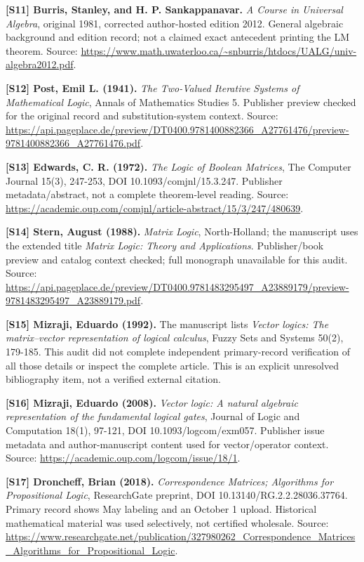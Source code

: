 \documentclass[
  10pt,
]{article}
\begin{document}
\textbf{{[}S11{]} Burris, Stanley, and H. P. Sankappanavar.} \emph{A
Course in Universal Algebra}, original 1981, corrected author-hosted
edition 2012. General algebraic background and edition record; not a
claimed exact antecedent printing the LM theorem. Source:
\url{https://www.math.uwaterloo.ca/~snburris/htdocs/UALG/univ-algebra2012.pdf}.

\textbf{{[}S12{]} Post, Emil L. (1941).} \emph{The Two-Valued Iterative
Systems of Mathematical Logic}, Annals of Mathematics Studies 5.
Publisher preview checked for the original record and
substitution-system context. Source:
\url{https://api.pageplace.de/preview/DT0400.9781400882366_A27761476/preview-9781400882366_A27761476.pdf}.

\textbf{{[}S13{]} Edwards, C. R. (1972).} \emph{The Logic of Boolean
Matrices}, The Computer Journal 15(3), 247-253, DOI
10.1093/comjnl/15.3.247. Publisher metadata/abstract, not a complete
theorem-level reading. Source:
\url{https://academic.oup.com/comjnl/article-abstract/15/3/247/480639}.

\textbf{{[}S14{]} Stern, August (1988).} \emph{Matrix Logic},
North-Holland; the manuscript uses the extended title \emph{Matrix
Logic: Theory and Applications}. Publisher/book preview and catalog
context checked; full monograph unavailable for this audit. Source:
\url{https://api.pageplace.de/preview/DT0400.9781483295497_A23889179/preview-9781483295497_A23889179.pdf}.

\textbf{{[}S15{]} Mizraji, Eduardo (1992).} The manuscript lists
\emph{Vector logics: The matrix--vector representation of logical
calculus}, Fuzzy Sets and Systems 50(2), 179-185. This audit did not
complete independent primary-record verification of all those details or
inspect the complete article. This is an explicit unresolved
bibliography item, not a verified external citation.

\textbf{{[}S16{]} Mizraji, Eduardo (2008).} \emph{Vector logic: A
natural algebraic representation of the fundamental logical gates},
Journal of Logic and Computation 18(1), 97-121, DOI
10.1093/logcom/exm057. Publisher issue metadata and author-manuscript
content used for vector/operator context. Source:
\url{https://academic.oup.com/logcom/issue/18/1}.

\textbf{{[}S17{]} Droncheff, Brian (2018).} \emph{Correspondence
Matrices; Algorithms for Propositional Logic}, ResearchGate preprint,
DOI 10.13140/RG.2.2.28036.37764. Primary record shows May labeling and
an October 1 upload. Historical mathematical material was used
selectively, not certified wholesale. Source:
\url{https://www.researchgate.net/publication/327980262_Correspondence_Matrices_Algorithms_for_Propositional_Logic}.
\end{document}
